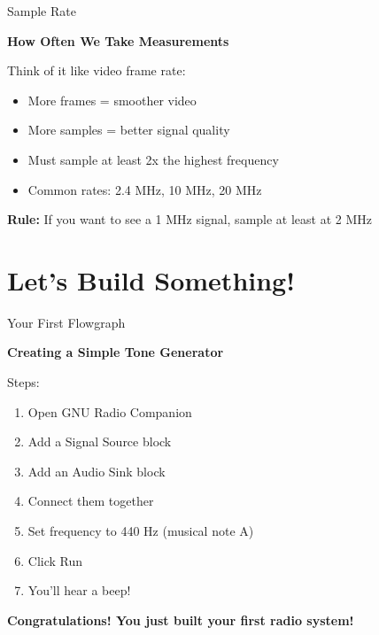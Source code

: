 \documentclass[aspectratio=169,12pt]{beamer}
\begin{document}
\begin{frame}{Sample Rate}
\begin{center}
\Large\textbf{How Often We Take Measurements}
\end{center}
\vspace{1em}

Think of it like video frame rate:
\begin{itemize}
    \item More frames = smoother video
    \item More samples = better signal quality
    \item Must sample at least 2x the highest frequency
    \item Common rates: 2.4 MHz, 10 MHz, 20 MHz
\end{itemize}

\vspace{1em}
\begin{center}
\colorbox{yellow!20}{\parbox{0.8\textwidth}{\centering
\textbf{Rule:} If you want to see a 1 MHz signal, sample at least at 2 MHz}}
\end{center}
\end{frame}

\section{Let's Build Something!}

\begin{frame}{Your First Flowgraph}
\begin{center}
\Large\textbf{Creating a Simple Tone Generator}
\end{center}
\vspace{1em}

Steps:
\begin{enumerate}
    \item Open GNU Radio Companion
    \item Add a Signal Source block
    \item Add an Audio Sink block
    \item Connect them together
    \item Set frequency to 440 Hz (musical note A)
    \item Click Run
    \item You'll hear a beep!
\end{enumerate}

\vspace{1em}
\begin{center}
\colorbox{radiogreen!20}{\parbox{0.8\textwidth}{\centering
\textbf{Congratulations! You just built your first radio system!}}}
\end{center}
\end{frame}
\end{document}
